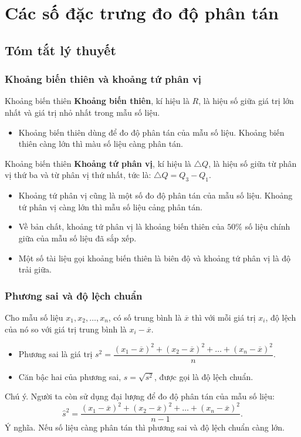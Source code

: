 \section{Các số đặc trưng đo độ phân tán}
\subsection{Tóm tắt lý thuyết}
\subsubsection{Khoảng biến thiên và khoảng tứ phân vị}
\begin{dn}{Khoảng biến thiên}
	\textbf{Khoảng biến thiên}, kí hiệu là $R$, là hiệu số giữa giá trị lớn nhất và giá trị nhỏ nhất trong
	mẫu số liệu.
\end{dn}
\begin{itemize}
	\item Khoảng biến thiên dùng để đo độ phân tán của mẫu số liệu. Khoảng biến thiên càng lớn thì màu số liệu càng phân tán.
\end{itemize}

\begin{dn}{Khoảng biến thiên}
	\textbf{Khoảng tứ phân vị}, kí hiệu là $ \triangle Q $, là hiệu số giữa từ phân vị thứ ba và từ phân vị thứ nhất, tức là:
	$ \triangle Q=Q_3-Q_1 $.
\end{dn}
\begin{itemize}
	\item Khoảng tứ phân vị cũng là một số đo độ phân tán của mẫu số liệu. Khoảng tứ phân vị càng lớn thì mẫu số liệu cảng phân tán.
	\item Về bản chất, khoảng tứ phân vị là khoảng biến thiên của $50 \%$ số liệu chính giữa của mẫu số liệu đã sắp xếp.
	\item Một số tài liệu gọi khoảng biến thiên là biên độ và khoảng tứ phân vị là độ trải giữa.
\end{itemize}



\subsubsection{Phương sai và độ lệch chuẩn}
\begin{dn}{}
	Cho mẫu số liệu $x_{1}, x_{2}, \ldots, x_{n}$, có số trung bình là $\overline{x}$ thì với mỗi giá trị $x_{i}$, độ lệch của nó so với giá trị trung bình là $x_{i}-\overline{x}$.
	\begin{itemize}
		\item Phương sai là giá trị $s^2=\dfrac{\left(x_{1}-\overline{x}\right)^{2}+\left(x_{2}-\overline{x}\right)^{2}+\ldots+\left(x_{n}-\overline{x}\right)^{2}}{n}$.\\
		\item Căn bậc hai của phương sai, $s=\sqrt{s^{2}}$, được gọi là độ lệch chuẩn.
	\end{itemize}
	Chú ý. Người ta còn sử dụng đại lượng để đo độ phân tán của mẫu số liệu:
	$$\hat{s}^{2}=\dfrac{\left(x_{1}-\overline{x}\right)^{2}+\left(x_{2}-\overline{x}\right)^{2}+\ldots+\left(x_{n}-\overline{x}\right)^{2}}{n-1}.$$
	Ý nghĩa. Nếu số liệu càng phân tán thì phương sai và độ lệch chuẩn càng lớn.
\end{dn}

